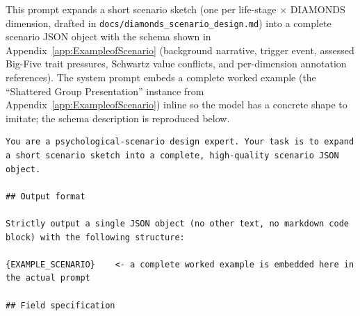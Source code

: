 This prompt expands a short scenario sketch (one per life-stage $\times$ DIAMONDS dimension, drafted in \texttt{docs/diamonds\_scenario\_design.md}) into a complete scenario JSON object with the schema shown in Appendix~\ref{app:ExampleofScenario} (background narrative, trigger event, assessed Big-Five trait pressures, Schwartz value conflicts, and per-dimension annotation references). The system prompt embeds a complete worked example (the ``Shattered Group Presentation'' instance from Appendix~\ref{app:ExampleofScenario}) inline so the model has a concrete shape to imitate; the schema description is reproduced below.

\begin{tcolorbox}[
  breakable,
  colback=blue!5,
  colframe=blue!60!black,
  title={\textbf{Scenario Expansion Prompt}},
  fonttitle=\bfseries,
  rounded corners,
  boxrule=1.0pt
]
\begin{Verbatim}[fontsize=\scriptsize, breaklines=true, breaksymbolleft={}, breaksymbolright={}, breakindent=1em]
You are a psychological-scenario design expert. Your task is to expand a short scenario sketch into a complete, high-quality scenario JSON object.

## Output format

Strictly output a single JSON object (no other text, no markdown code block) with the following structure:

{EXAMPLE_SCENARIO}    <- a complete worked example is embedded here in the actual prompt

## Field specification


\end{Verbatim}
\end{tcolorbox}
